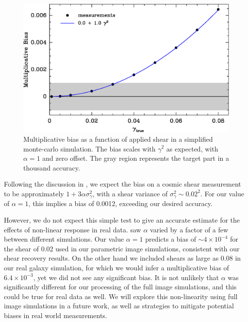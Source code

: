 \documentclass[iop]{emulateapj}
\begin{document}
\begin{figure}
	\centering
    \includegraphics[width=\columnwidth]{weaklens-approx.eps}

	\caption{Multiplicative bias as a function of applied shear in a
	simplified monte-carlo simulation.  The bias scales with $\gamma^2$
	as expected, with $\alpha=1$ and zero offset. The gray
	region represents the target part in a thousand accuracy.}

\label{fig:weaklens}
\end{figure}

Following the discussion in \cite{bfd2016}, we expect the bias on a cosmic
shear measurement to be approximately $1 + 3\alpha\sigma_\gamma^2$, with a
shear variance of $\sigma_\gamma^2 \sim 0.02^2$.  For our value of $\alpha=1$,
this implies a bias of 0.0012, exceeding our desired accuracy.

However, we do not expect this simple test to give an accurate estimate for the
effects of non-linear response in real data.  \cite{bfd2016} saw $\alpha$
varied by a factor of a few between different simulations. Our value $\alpha=1$
predicts a bias of $\sim 4 \times 10^{-4}$ for the shear of 0.02 used in our
parametric image simulations, consistent with our shear recovery results.  On
the other hand we included shears as large as 0.08 in our real galaxy
simulation, for which we would infer a multiplicative bias of $6.4 \times
10^{-3}$, yet we did not see any significant bias.  It is not unlikely that
$\alpha$ was significantly different for our processing of the full image
simulations, and this could be true for real data as well.  We will explore
this non-linearity using full image simulations in a future work, as well as
strategies to mitigate potential biases in real world measurements.
\end{document}
